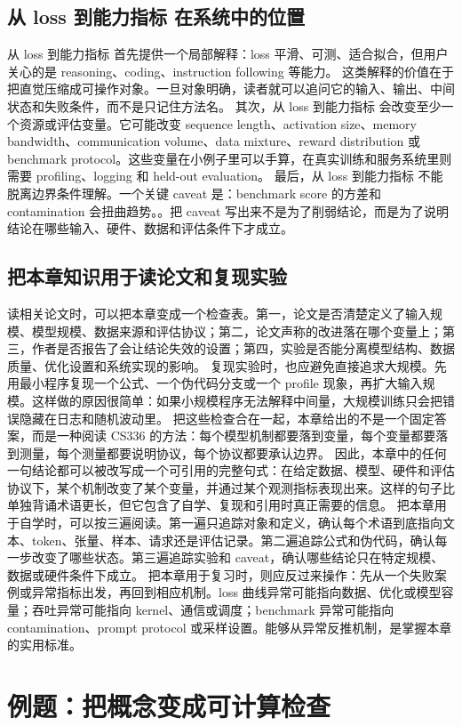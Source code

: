\documentclass[a4paper]{article}
\begin{document}
\subsection{从 loss 到能力指标 在系统中的位置}
从 loss 到能力指标 首先提供一个局部解释：loss 平滑、可测、适合拟合，但用户关心的是 reasoning、coding、instruction following 等能力。 这类解释的价值在于把直觉压缩成可操作对象。一旦对象明确，读者就可以追问它的输入、输出、中间状态和失败条件，而不是只记住方法名。
其次，从 loss 到能力指标 会改变至少一个资源或评估变量。它可能改变 sequence length、activation size、memory bandwidth、communication volume、data mixture、reward distribution 或 benchmark protocol。这些变量在小例子里可以手算，在真实训练和服务系统里则需要 profiling、logging 和 held-out evaluation。
最后，从 loss 到能力指标 不能脱离边界条件理解。一个关键 caveat 是：benchmark score 的方差和 contamination 会扭曲趋势。。把 caveat 写出来不是为了削弱结论，而是为了说明结论在哪些输入、硬件、数据和评估条件下才成立。
\subsection{把本章知识用于读论文和复现实验}
读相关论文时，可以把本章变成一个检查表。第一，论文是否清楚定义了输入规模、模型规模、数据来源和评估协议；第二，论文声称的改进落在哪个变量上；第三，作者是否报告了会让结论失效的设置；第四，实验是否能分离模型结构、数据质量、优化设置和系统实现的影响。
复现实验时，也应避免直接追求大规模。先用最小程序复现一个公式、一个伪代码分支或一个 profile 现象，再扩大输入规模。这样做的原因很简单：如果小规模程序无法解释中间量，大规模训练只会把错误隐藏在日志和随机波动里。
把这些检查合在一起，本章给出的不是一个固定答案，而是一种阅读 CS336 的方法：每个模型机制都要落到变量，每个变量都要落到测量，每个测量都要说明协议，每个协议都要承认边界。
因此，本章中的任何一句结论都可以被改写成一个可引用的完整句式：在给定数据、模型、硬件和评估协议下，某个机制改变了某个变量，并通过某个观测指标表现出来。这样的句子比单独背诵术语更长，但它包含了自学、复现和引用时真正需要的信息。
把本章用于自学时，可以按三遍阅读。第一遍只追踪对象和定义，确认每个术语到底指向文本、token、张量、样本、请求还是评估记录。第二遍追踪公式和伪代码，确认每一步改变了哪些状态。第三遍追踪实验和 caveat，确认哪些结论只在特定规模、数据或硬件条件下成立。
把本章用于复习时，则应反过来操作：先从一个失败案例或异常指标出发，再回到相应机制。loss 曲线异常可能指向数据、优化或模型容量；吞吐异常可能指向 kernel、通信或调度；benchmark 异常可能指向 contamination、prompt protocol 或采样设置。能够从异常反推机制，是掌握本章的实用标准。
\section{例题：把概念变成可计算检查}
\end{document}
